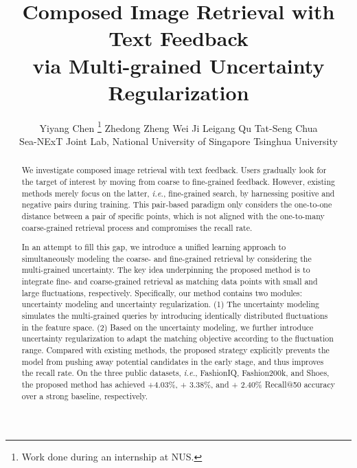 \documentclass[10pt,twocolumn,letterpaper]{article}
\def\ie{\emph{i.e.}}
\begin{document}
\title{Composed Image Retrieval with Text Feedback\\ via Multi-grained Uncertainty Regularization}
\author{
    Yiyang Chen \thanks{Work done during an internship at NUS.} \quad Zhedong Zheng \quad Wei Ji \quad Leigang Qu \quad Tat-Seng Chua
    \\
      Sea-NExT Joint Lab, National University of Singapore \quad Tsinghua University 
    }

\maketitle

\begin{abstract}
We investigate composed image retrieval with text feedback.
Users gradually look for the target of interest by moving from coarse to fine-grained feedback.  
However, existing methods merely focus on the latter, \ie, fine-grained search, by harnessing positive and negative pairs during training. This pair-based paradigm only considers the one-to-one distance between a pair of specific points, which is not aligned with the one-to-many coarse-grained retrieval process and compromises the recall rate. 

In an attempt to fill this gap, we introduce a unified learning approach to simultaneously modeling the coarse- and fine-grained retrieval by considering the multi-grained uncertainty. 
The key idea underpinning the proposed method is to integrate fine- and coarse-grained retrieval as matching data points with small and large fluctuations, respectively.
Specifically, our method contains two modules: uncertainty modeling and uncertainty regularization. 
(1) The uncertainty modeling simulates the multi-grained queries by introducing identically distributed fluctuations in the feature space. 
(2) Based on the uncertainty modeling, we further introduce uncertainty regularization to adapt the matching objective according to the fluctuation range.
Compared with existing methods, the proposed strategy explicitly prevents the model from pushing away potential candidates in the early stage, and thus improves the recall rate.  
On the three public datasets, \ie, FashionIQ, Fashion200k, and Shoes, the proposed method has achieved +4.03\%, + 3.38\%, and + 2.40\% Recall@50 accuracy over a strong baseline, respectively. 
\end{abstract}
\end{document}
